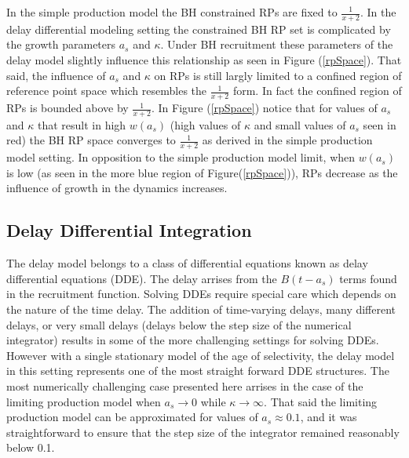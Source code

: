 %
In the simple production model the BH constrained RPs are fixed to $\frac{1}{x+2}$.
In the delay differential modeling setting the constrained BH RP set is 
complicated by the growth parameters $a_s$ and $\kappa$.
Under BH recruitment these parameters of the delay model slightly %
influence this relationship as seen in Figure (\ref{rpSpace}). That said, 
the influence of $a_s$ and $\kappa$ on RPs is still largly limited to a 
confined region of reference point space which resembles the $\frac{1}{x+2}$ 
form. In fact the confined region of RPs is bounded above by $\frac{1}{x+2}$. %
In Figure (\ref{rpSpace}) notice that for values of $a_s$ and $\kappa$ that 
result in high $w(a_s)$ (high values of $\kappa$ and small values of $a_s$ seen 
in red) the BH RP space converges to $\frac{1}{x+2}$ as derived in the simple 
production model setting. In opposition to the simple production model limit, 
when $w(a_s)$ is low (as seen in the more blue region of Figure(\ref{rpSpace})), RPs 
decrease as the influence of growth in the dynamics increases. 

%
\subsection{Delay Differential Integration}

%
The delay model belongs to a class of differential equations known as delay 
differential equations (DDE). The delay arrises from the $B(t-a_s)$ terms 
found in the recruitment function. Solving DDEs require special care which 
depends on the nature of the time delay. The addition of time-varying delays, 
many different delays, or very small delays (delays below the step size of the 
numerical integrator) results in some of the more challenging settings for 
solving DDEs. However with a single stationary model of the age of selectivity, 
the delay model in this setting represents one of the most straight forward 
DDE structures. The most numerically challenging case presented here arrises 
in the case of the limiting production model when $a_s\to0$ while $\kappa\to\infty$. 
That said the limiting production model can be approximated for values of 
$a_s\approx0.1$, and it was straightforward to ensure that the step size of 
the integrator remained reasonably below 0.1. 

